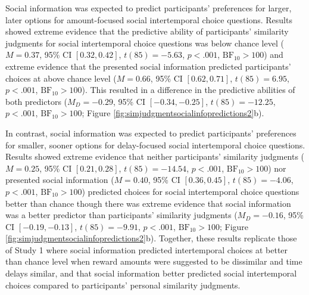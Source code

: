 \documentclass[
  pub,floatsintext]{apa6}
\begin{document}
Social information was expected to predict participants' preferences for larger, later options for amount-focused social intertemporal choice questions. Results showed extreme evidence that the predictive ability of participants' similarity judgments for social intertemporal choice questions was below chance level (\(M = 0.37\), 95\% CI \([0.32, 0.42]\), \(t(85) = -5.63\), \(p < .001\), \(\mathrm{BF}_{\textrm{10}} > 100\)) and extreme evidence that the presented social information predicted participants' choices at above chance level (\(M = 0.66\), 95\% CI \([0.62, 0.71]\), \(t(85) = 6.95\), \(p < .001\), \(\mathrm{BF}_{\textrm{10}} > 100\)). This resulted in a difference in the predictive abilities of both predictors (\(M_D = -0.29\), 95\% CI \([-0.34, -0.25]\), \(t(85) = -12.25\), \(p < .001\), \(\mathrm{BF}_{\textrm{10}} > 100\); Figure \ref{fig:simjudgmentsocialinfopredictions2}b).

In contrast, social information was expected to predict participants' preferences for smaller, sooner options for delay-focused social intertemporal choice questions. Results showed extreme evidence that neither participants' similarity judgments (\(M = 0.25\), 95\% CI \([0.21, 0.28]\), \(t(85) = -14.54\), \(p < .001\), \(\mathrm{BF}_{\textrm{10}} > 100\)) nor presented social information (\(M = 0.40\), 95\% CI \([0.36, 0.45]\), \(t(85) = -4.06\), \(p < .001\), \(\mathrm{BF}_{\textrm{10}} > 100\)) predicted choices for social intertemporal choice questions better than chance though there was extreme evidence that social information was a better predictor than participants' similarity judgments (\(M_D = -0.16\), 95\% CI \([-0.19, -0.13]\), \(t(85) = -9.91\), \(p < .001\), \(\mathrm{BF}_{\textrm{10}} > 100\); Figure \ref{fig:simjudgmentsocialinfopredictions2}b). Together, these results replicate those of Study 1 where social information predicted intertemporal choices at better than chance level when reward amounts were suggested to be dissimilar and time delays similar, and that social information better predicted social intertemporal choices compared to participants' personal similarity judgments.
\end{document}

